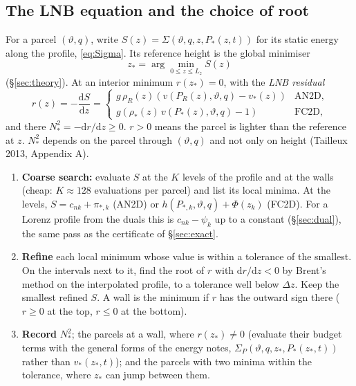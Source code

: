\documentclass[11pt,a4paper]{article}
\newcommand{\vt}{\vartheta}
\newcommand{\zs}{z_{*}}
\begin{document}
\subsection{The LNB equation and the choice of root}\label{sec:lnb}
For a parcel $(\vt,q)$, write $S(z)=\Sigma(\vt,q,z,P_*(z,t))$ for its static energy along the profile, \eqref{eq:Sigma}.
Its reference height is the global minimiser
\begin{equation}
  \zs=\arg\min_{0\le z\le L_z}S(z)
  \label{eq:zstar}
\end{equation}
(\S\ref{sec:theory}). At an interior minimum $r(\zs)=0$, with the \emph{LNB residual}
\begin{equation}
  r(z)=-\frac{\mathrm{d}S}{\mathrm{d}z}=\begin{cases}
    g\,\rho_R(z)\left(v(P_R(z),\vt,q)-v_*(z)\right) & \text{AN2D},\\[2pt]
    g\left(\rho_*(z)\,v(P_*(z),\vt,q)-1\right) & \text{FC2D},
  \end{cases}
\end{equation}
and there $N_*^2=-\mathrm{d}r/\mathrm{d}z\ge0$. $r>0$ means the parcel is lighter than the reference at $z$. $N_*^2$ depends
on the parcel through $(\vt,q)$ and not only on height (Tailleux 2013, Appendix A).
\begin{enumerate}
  \item \textbf{Coarse search:} evaluate $S$ at the $K$ levels of the profile and at the walls (cheap: $K\approx128$
        evaluations per parcel) and list its local minima. At the levels, $S=c_{nk}+\pi_{*,k}$ (AN2D) or
        $h(P_{*,k},\vt,q)+\Phi(z_k)$ (FC2D). For a Lorenz profile from the duals this is $c_{nk}-\psi_k$ up to a constant
        (\S\ref{sec:dual}), the same pass as the certificate of \S\ref{sec:exact}.
  \item \textbf{Refine} each local minimum whose value is within a tolerance of the smallest. On the intervals next to it,
        find the root of $r$ with $\mathrm{d}r/\mathrm{d}z<0$ by Brent's method on the interpolated profile, to a tolerance
        well below $\Delta z$. Keep the smallest refined $S$. A wall is the minimum if $r$ has the outward sign there ($r\ge0$
        at the top, $r\le0$ at the bottom).
  \item \textbf{Record} $N_*^2$; the parcels at a wall, where $r(\zs)\ne0$ (evaluate their budget terms with the general
        forms of the energy notes, $\Sigma_P(\vt,q,\zs,P_*(\zs,t))$ rather than $v_*(\zs,t)$); and the parcels with two minima
        within the tolerance, where $\zs$ can jump between them.
\end{enumerate}
\end{document}
